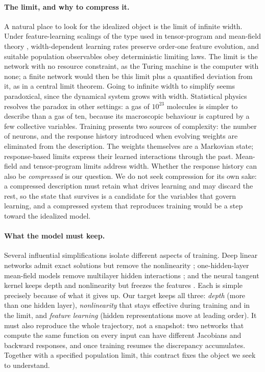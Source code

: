 \documentclass[11pt]{article}
\theoremstyle{definition}
\theoremstyle{remark}
\begin{document}
\paragraph{The limit, and why to compress it.}
A natural place to look for the idealized object is the limit of infinite width.
Under feature-learning scalings of the type used in tensor-program and mean-field
theory \citep{yang2021tensor,nguyen2023rigorous}, width-dependent learning rates
preserve order-one feature evolution, and suitable population observables obey
deterministic limiting laws.  The limit is the network with no resource
constraint, as the Turing machine is the computer with none; a finite network
would then be this limit plus a quantified deviation from it, as in a central
limit theorem.  Going to infinite width to simplify seems paradoxical, since the
dynamical system grows with width.  Statistical physics resolves the paradox in
other settings: a gas of $10^{23}$ molecules is simpler to describe than a gas
of ten, because its macroscopic behaviour is captured by a few collective
variables.  Training presents two sources of complexity: the number of neurons,
and the response history introduced when evolving weights are eliminated from
the description.  The weights themselves are a Markovian state; response-based
limits express their learned interactions through the past.  Mean-field and
tensor-program limits address width.  Whether the response history can also be
\emph{compressed} is our question.  We do not seek compression for its own
sake: a compressed description must retain what drives learning and may discard
the rest, so the state that survives is a candidate for the variables that
govern learning, and a compressed system that reproduces training would be a
step toward the idealized model.

\paragraph{What the model must keep.}
Several influential simplifications isolate different aspects of training.
Deep linear networks admit exact solutions but remove the
nonlinearity \citep{saxe2014exact}; one-hidden-layer mean-field models remove
multilayer hidden interactions \citep{chizat2018global,mei2018meanfield,sirignano2019lln}; and
the neural tangent kernel keeps depth and nonlinearity but freezes the features
\citep{jacot2018ntk,lee2019wide,chizat2019lazy}.  Each is simple precisely
because of what it gives up.  Our target keeps all three: \emph{depth} (more than one
hidden layer), \emph{nonlinearity} that stays effective during training and in
the limit, and \emph{feature learning} (hidden representations move at leading
order).  It must also reproduce the whole trajectory, not a snapshot: two
networks that compute the same function on every input can have different
Jacobians and backward responses, and once training resumes the discrepancy
accumulates.  Together with a specified population limit, this contract fixes
the object we seek to understand.
\end{document}
